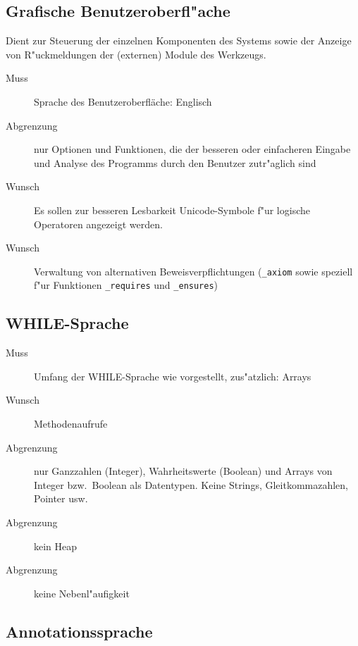 \subsection{Grafische Benutzeroberfl"ache}%

Dient zur Steuerung der einzelnen Komponenten des Systems sowie der Anzeige von R"uckmeldungen der (externen) \see Module des Werkzeugs.%

\begin{description}%
    \item [Muss] Sprache des Benutzeroberfläche: Englisch%
    \item [Abgrenzung] nur Optionen und Funktionen, die der besseren oder einfacheren Eingabe und Analyse des Programms durch den Benutzer zutr"aglich sind%
    \item [Wunsch] Es sollen zur besseren Lesbarkeit \see Unicode-Symbole f"ur \see logische Operatoren angezeigt werden.%
    \item [Wunsch] Verwaltung von alternativen \see Beweisverpflichtungen (\texttt{\_axiom} sowie speziell f"ur Funktionen \texttt{\_requires} und \texttt{\_ensures})%
\end{description}%

\subsection{\see WHILE-Sprache}%

\begin{description}%
    \item [Muss] Umfang der WHILE-Sprache wie vorgestellt, zus"atzlich: Arrays%
    \item [Wunsch] Methodenaufrufe%
    \item [Abgrenzung] nur Ganzzahlen (Integer), Wahrheitswerte (Boolean) und Arrays von Integer bzw.\ Boolean als Datentypen. Keine Strings, Gleitkommazahlen, Pointer usw.%
    \item [Abgrenzung] kein \see Heap%
    \item [Abgrenzung] keine \see Nebenl"aufigkeit%
\end{description}%

\subsection{Annotationssprache}%

